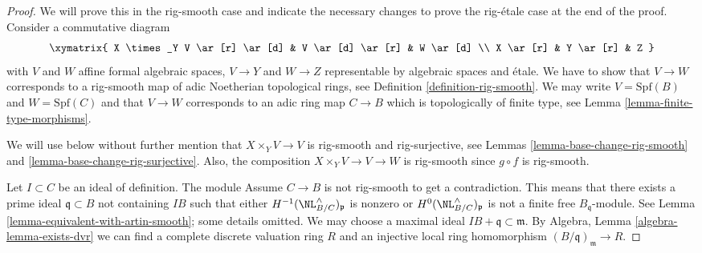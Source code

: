 \begin{proof}
We will prove this in the rig-smooth case and indicate the necessary
changes to prove the rig-\'etale case at the end of the proof.
Consider a commutative diagram
$$
\xymatrix{
X \times_Y V \ar[r] \ar[d] &
V \ar[d] \ar[r] &
W \ar[d] \\
X \ar[r] &
Y \ar[r] &
Z
}
$$
with $V$ and $W$ affine formal algebraic spaces, $V \to Y$ and $W \to Z$
representable by algebraic spaces and \'etale. We have to show that
$V \to W$ corresponds to a rig-smooth map of adic Noetherian topological
rings, see Definition \ref{definition-rig-smooth}.
We may write $V = \text{Spf}(B)$ and $W = \text{Spf}(C)$ and that
$V \to W$ corresponds to an adic ring map $C \to B$ which is topologically
of finite type, see Lemma \ref{lemma-finite-type-morphisms}.

\medskip\noindent
We will use below without further mention that $X \times_Y V \to V$
is rig-smooth and rig-surjective, see
Lemmas \ref{lemma-base-change-rig-smooth} and
\ref{lemma-base-change-rig-surjective}.
Also, the composition $X \times_Y V \to V \to W$ is rig-smooth
since $g \circ f$ is rig-smooth.

\medskip\noindent
Let $I \subset C$ be an ideal of definition. The module
Assume $C \to B$ is not rig-smooth to get a contradiction.
This means that there exists a prime ideal $\mathfrak q \subset B$
not containing $IB$ such that either $H^{-1}(\NL_{B/C}^\wedge)_\mathfrak p$
is nonzero or $H^0(\NL_{B/C}^\wedge)_\mathfrak p$ is not a finite free
$B_\mathfrak q$-module. See
Lemma \ref{lemma-equivalent-with-artin-smooth}; some details
omitted. We may choose a maximal ideal
$IB + \mathfrak q \subset \mathfrak m$. By
Algebra, Lemma \ref{algebra-lemma-exists-dvr}
we can find a complete discrete valuation ring $R$ and an injective
local ring homomorphism $(B/\mathfrak q)_\mathfrak m \to R$.


\end{proof}

